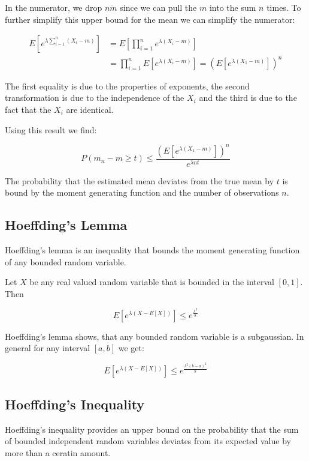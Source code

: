 \documentclass[12pt, authoryear]{elsarticle}
\begin{document}
In the numerator, we drop $n \dot m$ since we can pull the $m$ into the sum $n$ times. To further simplify this upper bound for the mean we can simplify the numerator:

\begin{equation*} 
\begin{split}
E[e^{\lambda \sum_{i=1}^{n} (X_i - m) } ] &= E[\prod_{i=1}^n e^{\lambda (X_i -m)}] \\
&= \prod_{i=1}^n E[e^{\lambda (X_i -m)}] = (E[e^{\lambda (X_1 - m)}])^n
\end{split}
\end{equation*}

The first equality is due to the properties of exponents, the second transformation is due to the independence of the $X_i$ and the third is due to the fact that the $X_i$ are identical. 

Using this result we find:

$$ P( m_n - m \geq t ) \leq \frac{(E[e^{\lambda (X_1 - m)}])^n}{e^{\lambda nt}}$$

The probability that the estimated mean deviates from the true mean by $t$ is bound by the moment generating function and the number of observations $n$. 

\subsection{Hoeffding's Lemma}

Hoeffding's lemma is an inequality that bounds the moment generating function of any bounded random variable. 

Let $X$ be any real valued random variable that is bounded in the interval $[0,1]$. Then 

$$ E[e^{\lambda (X- E[X])}] \leq e^{\frac{\lambda^2}{8}} $$

Hoeffding's lemma shows, that any bounded random variable is a subgaussian. In general for any interval $[a,b]$ we get:

$$ E[e^{\lambda (X- E[X])}] \leq e^{\frac{\lambda^2(b-a)^2}{8}} $$

\subsection{Hoeffding's Inequality}

Hoeffding's inequality provides an upper bound on the probability that the sum of bounded independent random variables deviates from its expected value by more than a ceratin amount. 
\end{document}
